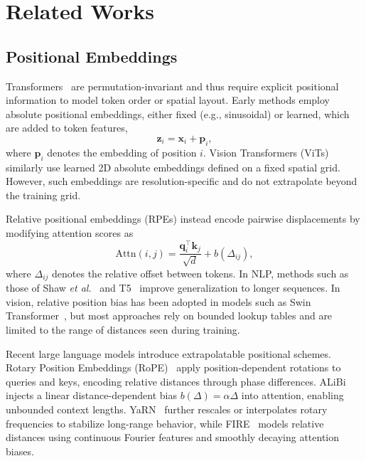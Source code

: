 \section{Related Works}
\label{sec:related_work}

\subsection{Positional Embeddings}

Transformers~\cite{vaswani2017attention} are permutation-invariant and thus require explicit positional information to model token order or spatial layout. Early methods employ absolute positional embeddings, either fixed (e.g., sinusoidal) or learned, which are added to token features,
\begin{equation}
\mathbf{z}_i = \mathbf{x}_i + \mathbf{p}_i ,
\end{equation}
where $\mathbf{p}_i$ denotes the embedding of position $i$. Vision Transformers (ViTs)~\cite{dosovitskiy2021image} similarly use learned 2D absolute embeddings defined on a fixed spatial grid. However, such embeddings are resolution-specific and do not extrapolate beyond the training grid.

Relative positional embeddings (RPEs) instead encode pairwise displacements by modifying attention scores as
\begin{equation}
\text{Attn}(i,j) = \frac{\mathbf{q}_i^\top \mathbf{k}_j}{\sqrt{d}} + b(\Delta_{ij}),
\end{equation}
where $\Delta_{ij}$ denotes the relative offset between tokens. In NLP, methods such as those of Shaw \emph{et al.}~\cite{shaw2018self} and T5~\cite{raffel2020exploring} improve generalization to longer sequences. In vision, relative position bias has been adopted in models such as Swin Transformer~\cite{liu2021swin}, but most approaches rely on bounded lookup tables and are limited to the range of distances seen during training.

Recent large language models introduce extrapolatable positional schemes. Rotary Position Embeddings (RoPE)~\cite{su2024roformer} apply position-dependent rotations to queries and keys, encoding relative distances through phase differences. ALiBi~\cite{press2022train} injects a linear distance-dependent bias $b(\Delta)=\alpha\Delta$ into attention, enabling unbounded context lengths. YaRN~\cite{peng2024yarn} further rescales or interpolates rotary frequencies to stabilize long-range behavior, while FIRE~\cite{li2024functional} models relative distances using continuous Fourier features and smoothly decaying attention biases.

